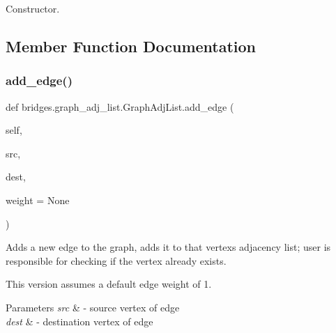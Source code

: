 Constructor. 



\subsection{Member Function Documentation}
\mbox{\label{classbridges_1_1graph__adj__list_1_1_graph_adj_list_ad26ebc06132389d57f66395024a4a27a}} 
\subsubsection{\texorpdfstring{add\+\_\+edge()}{add\_edge()}}
{\footnotesize\ttfamily def bridges.\+graph\+\_\+adj\+\_\+list.\+Graph\+Adj\+List.\+add\+\_\+edge (\begin{DoxyParamCaption}\item[{}]{self,  }\item[{}]{src,  }\item[{}]{dest,  }\item[{}]{weight = {\ttfamily None} }\end{DoxyParamCaption})}



Adds a new edge to the graph, adds it to that vertex\textquotesingle{}s adjacency list; user is responsible for checking if the vertex already exists. 

This version assumes a default edge weight of 1.


\begin{DoxyParams}{Parameters}
{\em src} & -\/ source vertex of edge \\
\hline
{\em dest} & -\/ destination vertex of edge \\
\hline
\end{DoxyParams}
\mbox{\label{classbridges_1_1graph__adj__list_1_1_graph_adj_list_a5e8ecd31b5ebdee85e4b35e89335e129}} 
